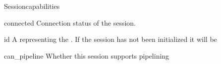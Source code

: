 \documentclass[a4paper,10pt,english]{manual}
\begin{document}
\begin{classdesc}{Session}{capabilities}
\hypertarget{ncclient.transport.Session.connected}{}\begin{memberdesc}{connected}
Connection status of the session.
\end{memberdesc}

\hypertarget{ncclient.transport.Session.id}{}\begin{memberdesc}{id}
A \href{http://docs.python.org/library/string.html\#string}{} representing the . If the session has not
been initialized it will be \href{http://docs.python.org/library/constants.html\#None}{}
\end{memberdesc}

\hypertarget{ncclient.transport.Session.can_pipeline}{}\begin{memberdesc}{can\_pipeline}
Whether this session supports pipelining
\end{memberdesc}
\end{classdesc}
\end{document}
